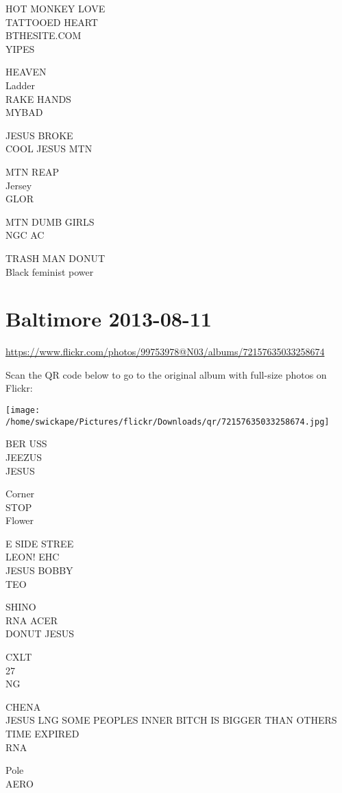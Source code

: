 \documentclass[10pt,letterpaper]{article}
\begin{document}
HOT MONKEY LOVE\\
TATTOOED HEART\\
BTHESITE.COM\\
YIPES

HEAVEN\\
Ladder\\
RAKE HANDS\\
MYBAD

JESUS BROKE\\
COOL JESUS MTN

MTN REAP\\
Jersey\\
GLOR

MTN DUMB GIRLS\\
NGC AC

TRASH MAN DONUT\\
Black feminist power
\pagebreak

\section*{Baltimore 2013-08-11}

\url{https://www.flickr.com/photos/99753978@N03/albums/72157635033258674}

Scan the QR code below to go to the original album with full-size photos on Flickr:

\texttt{[image: /home/swickape/Pictures/flickr/Downloads/qr/72157635033258674.jpg]}
\pagebreak

BER USS\\
JEEZUS\\
JESUS

Corner\\
STOP\\
Flower

E SIDE STREE\\
LEON! EHC\\
JESUS BOBBY\\
TEO

SHINO\\
RNA ACER\\
DONUT JESUS

CXLT\\
27\\
NG

CHENA\\
JESUS LNG SOME PEOPLES INNER BITCH IS BIGGER THAN OTHERS\\
TIME EXPIRED\\
RNA

Pole\\
AERO
\end{document}
